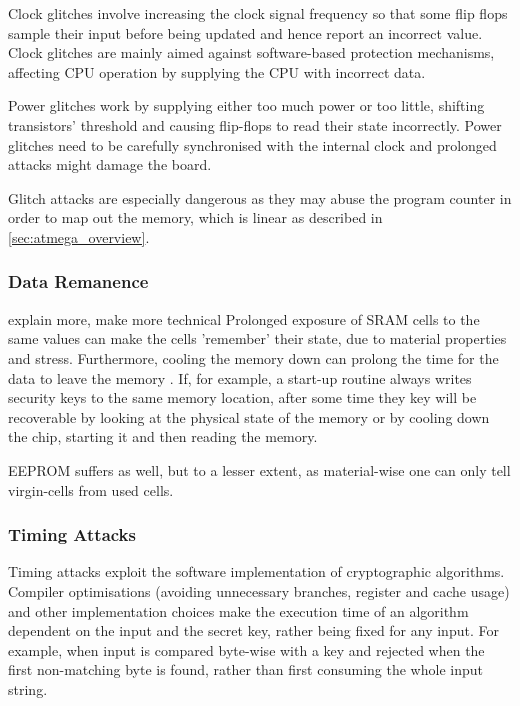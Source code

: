 	Clock glitches involve increasing the clock signal frequency so that some flip flops sample their input before being updated and hence report an incorrect value. Clock glitches are mainly aimed against software-based protection mechanisms, affecting CPU operation by supplying the CPU with incorrect data.
	
	Power glitches work by supplying either too much power or too little, shifting transistors' threshold and causing flip-flops to read their state incorrectly. Power glitches need to be carefully synchronised with the internal clock and prolonged attacks might damage the board.
	
	Glitch attacks are especially dangerous as they may abuse the program counter in order to map out the memory, which is linear as described in \ref{sec:atmega_overview}.
	
	\subsubsection{Data Remanence}
	{\color{red} explain more, make more technical}
	Prolonged exposure of SRAM cells to the same values can make the cells 'remember' their state, due to material properties and stress\citep{gutman:memory_remanence}. Furthermore, cooling the memory down can prolong the time for the data to leave the memory \citep{gutman:memory_remanence}\citep{sergei:RAM}\citep{sergei:thesis}. If, for example, a start-up routine always writes security keys to the same memory location, after some time they key will be recoverable by looking at the physical state of the memory or by cooling down the chip, starting it and then reading the memory.
	
	EEPROM suffers as well, but to a lesser extent, as material-wise one can only tell virgin-cells from used cells\citep{sergei:thesis}. 
	
	\subsubsection{Timing Attacks}
	Timing attacks exploit the software implementation of cryptographic algorithms. Compiler optimisations (avoiding unnecessary branches, register and cache usage) and other implementation choices make the execution time of an algorithm dependent on the input and the secret key, rather being fixed for any input. For example, when input is compared byte-wise with a key and rejected when the first non-matching byte is found, rather than first consuming the whole input string.
	
